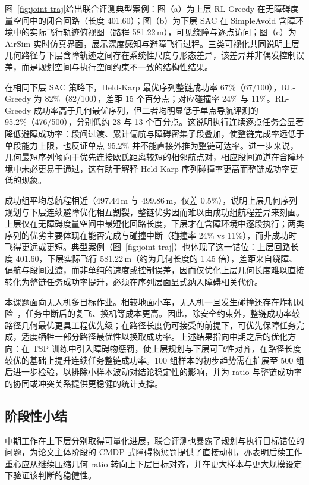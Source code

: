 图~\ref{fig:joint-traj}给出联合评测典型案例：图（a）为上层 RL-Greedy 在无障碍度量空间中的闭合回路（长度 401.60）；图（b）为下层 SAC 在 SimpleAvoid 含障环境中的实际飞行轨迹俯视图（路程 581.22\,m），可见绕障与逐点访问；图（c）为 AirSim 实时仿真界面，展示深度感知与避障飞行过程。三类可视化共同说明上层几何路径与下层含障轨迹之间存在系统性尺度与形态差异，该差异并非偶发控制误差，而是规划空间与执行空间约束不一致的结构性结果。

在相同下层 SAC 策略下，Held-Karp 最优序列整链成功率 67\%（67/100），RL-Greedy 为 82\%（82/100），差距 15 个百分点；对应碰撞率 24\% 与 11\%。RL-Greedy 成功率高于几何最优序列，但二者均明显低于单点导航评测的 95.2\%（476/500），分别低约 28 与 13 个百分点。这说明执行连续逐点任务会显著降低避障成功率：段间过渡、累计偏航与障碍密集子段叠加，使整链完成率远低于单段能力上限，也反证单点 95.2\% 并不能直接外推为整链可达率。进一步来说，几何最短序列倾向于优先连接欧氏距离较短的相邻航点对，相应段间通道在含障环境中未必更易于通过，这有助于解释 Held-Karp 序列碰撞率更高而整链成功率更低的现象。

成功组平均总航程相近（497.44\,m 与 499.86\,m，仅差 0.5\%），说明上层几何序列规划与下层连续避障优化相互割裂，整链优劣因而难以由成功组航程差异来刻画。上层仅在无障碍度量空间中最短化回路长度，下层才在含障环境中逐段执行；两类序列的优劣主要体现在能否完成与碰撞中断（碰撞率 24\% vs 11\%），而非成功时飞得更远或更短。典型案例（图~\ref{fig:joint-traj}）也体现了这一错位：上层回路长度 401.60，下层实际飞行 581.22\,m（约为几何长度的 1.45 倍），差距来自绕障、偏航与段间过渡，而非单纯的速度或控制误差，因而仅优化上层几何长度难以直接转化为整链任务成功率提升，必须在序列层面显式纳入障碍相关代价。

本课题面向无人机多目标作业。相较地面小车，无人机一旦发生碰撞还存在炸机风险~\cite{fang2024sac}，任务中断后的复飞、换机等成本更高。因此，除安全约束外，整链成功率较路径几何最优更具工程优先级；在路径长度仍可接受的前提下，可优先保障任务完成，适度牺牲一部分路径最优性以换取成功率。上述结果指向中期之后的优化方向：在 TSP 训练中引入障碍物惩罚，使上层规划与下层可飞性对齐，在路径长度较优的基础上提升连续任务整链成功率。100 组样本的初步趋势需在扩展至 500 组后进一步检验，以排除小样本波动对结论稳定性的影响，并为 ratio 与整链成功率的协同或冲突关系提供更稳健的统计支撑。

\subsection{阶段性小结}

中期工作在上下层分别取得可量化进展，联合评测也暴露了规划与执行目标错位的问题，为论文主体阶段的 CMDP 式障碍物惩罚提供了直接动机，亦表明后续工作重心应从继续压缩几何 ratio 转向上下层目标对齐，并在更大样本与更大规模设定下验证该判断的稳健性。

